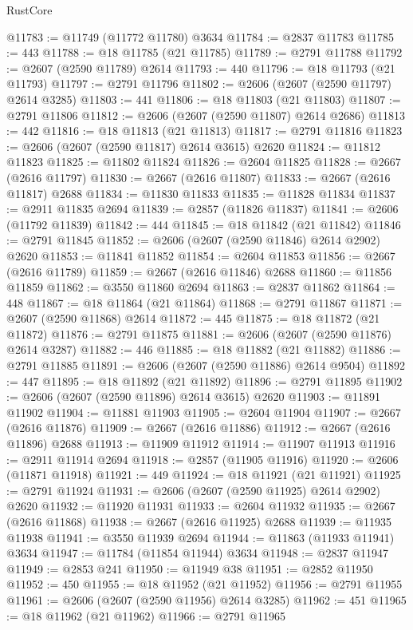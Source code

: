 \begin{lexlean}{RustCore}
\begin{coremodule}
@11783 := @11749 (@11772 @11780) @3634
@11784 := @2837 @11783
@11785 := 443
@11788 := @18 @11785 (@21 @11785)
@11789 := @2791 @11788
@11792 := @2607 (@2590 @11789) @2614
@11793 := 440
@11796 := @18 @11793 (@21 @11793)
@11797 := @2791 @11796
@11802 := @2606 (@2607 (@2590 @11797) @2614 @3285)
@11803 := 441
@11806 := @18 @11803 (@21 @11803)
@11807 := @2791 @11806
@11812 := @2606 (@2607 (@2590 @11807) @2614 @2686)
@11813 := 442
@11816 := @18 @11813 (@21 @11813)
@11817 := @2791 @11816
@11823 := @2606 (@2607 (@2590 @11817) @2614 @3615) @2620
@11824 := @11812 @11823
@11825 := @11802 @11824
@11826 := @2604 @11825
@11828 := @2667 (@2616 @11797)
@11830 := @2667 (@2616 @11807)
@11833 := @2667 (@2616 @11817) @2688
@11834 := @11830 @11833
@11835 := @11828 @11834
@11837 := @2911 @11835 @2694
@11839 := @2857 (@11826 @11837)
@11841 := @2606 (@11792 @11839)
@11842 := 444
@11845 := @18 @11842 (@21 @11842)
@11846 := @2791 @11845
@11852 := @2606 (@2607 (@2590 @11846) @2614 @2902) @2620
@11853 := @11841 @11852
@11854 := @2604 @11853
@11856 := @2667 (@2616 @11789)
@11859 := @2667 (@2616 @11846) @2688
@11860 := @11856 @11859
@11862 := @3550 @11860 @2694
@11863 := @2837 @11862
@11864 := 448
@11867 := @18 @11864 (@21 @11864)
@11868 := @2791 @11867
@11871 := @2607 (@2590 @11868) @2614
@11872 := 445
@11875 := @18 @11872 (@21 @11872)
@11876 := @2791 @11875
@11881 := @2606 (@2607 (@2590 @11876) @2614 @3287)
@11882 := 446
@11885 := @18 @11882 (@21 @11882)
@11886 := @2791 @11885
@11891 := @2606 (@2607 (@2590 @11886) @2614 @9504)
@11892 := 447
@11895 := @18 @11892 (@21 @11892)
@11896 := @2791 @11895
@11902 := @2606 (@2607 (@2590 @11896) @2614 @3615) @2620
@11903 := @11891 @11902
@11904 := @11881 @11903
@11905 := @2604 @11904
@11907 := @2667 (@2616 @11876)
@11909 := @2667 (@2616 @11886)
@11912 := @2667 (@2616 @11896) @2688
@11913 := @11909 @11912
@11914 := @11907 @11913
@11916 := @2911 @11914 @2694
@11918 := @2857 (@11905 @11916)
@11920 := @2606 (@11871 @11918)
@11921 := 449
@11924 := @18 @11921 (@21 @11921)
@11925 := @2791 @11924
@11931 := @2606 (@2607 (@2590 @11925) @2614 @2902) @2620
@11932 := @11920 @11931
@11933 := @2604 @11932
@11935 := @2667 (@2616 @11868)
@11938 := @2667 (@2616 @11925) @2688
@11939 := @11935 @11938
@11941 := @3550 @11939 @2694
@11944 := @11863 (@11933 @11941) @3634
@11947 := @11784 (@11854 @11944) @3634
@11948 := @2837 @11947
@11949 := @2853 @241
@11950 := @11949 @38
@11951 := @2852 @11950
@11952 := 450
@11955 := @18 @11952 (@21 @11952)
@11956 := @2791 @11955
@11961 := @2606 (@2607 (@2590 @11956) @2614 @3285)
@11962 := 451
@11965 := @18 @11962 (@21 @11962)
@11966 := @2791 @11965

\end{coremodule}
\end{lexlean}

